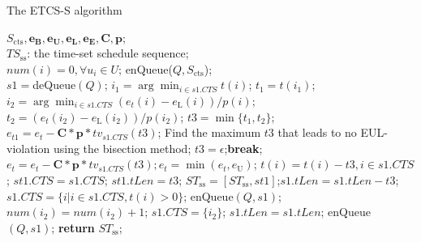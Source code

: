 \documentclass[journal,10pt]{IEEEtran}
\begin{document}
\begin{algorithm}[!htb]
\caption{The ETCS-S algorithm}
\begin{algorithmic}[1]\label{Alg_ETCS_S}
    \REQUIRE $S_\text{cts},\mathbf{e_B}, \mathbf{e_U}, \mathbf{e_L}, \mathbf{e_E}, \mathbf{C}, \mathbf{p}$;\\
    \ENSURE $TS_\text{ss}$: the time-set schedule sequence;\\
    \STATE $num(i)=0, {\forall}u_i{\in}U$; enQueue($Q,S_\text{cts}$); \\
        \STATE $s1{=}$deQueue$(Q)$;
        \STATE $i_1{=}\arg \min_{i{\in}s1.CTS}t(i)$; $t_1{=}t(i_1)$; \label{line_timelen_time}
        \STATE $i_2{=}\arg \min_{i{\in}s1.CTS}(e_t(i){-}e_\text{L}(i))/p(i)$; $t_2{=}(e_t(i_2){-}e_\text{L}(i_2))/p(i_2)$; \label{line_timelen_emin}
            \STATE $t3{=}\min\{t_1,t_2\}$;
            \STATE $e_{t1}{=}e_t{-}\mathbf{C}{*}\mathbf{p}{*}tv_{s1.CTS}(t3)$;
                \STATE Find the maximum $t3$ that leads to no EUL-violation using the bisection method;\label{line_timelen_emax}
                    \STATE $t3{=}\epsilon$;\textbf{break};\label{slicelen2epsilon}
                \ENDIF
            \ENDWHILE
            \STATE $e_{t}{=}e_t{-}\mathbf{C}{*}\mathbf{p}{*}tv_{s1.CTS}(t3); e_{t}{=}\min{(e_{t},e_\text{U})}$;
            \STATE $t(i){=}t(i){-}t3, i{\in}s1.CTS$;
            \STATE $st1.CTS{=}s1.CTS$; $st1.tLen{=}t3$;
            \STATE $ST_\text{ss}{=}[ST_\text{ss},st1]$;$s1.tLen{=}s1.tLen{-}t3$;
            \STATE $s1.CTS{=}\{i|i{\in}s1.CTS, t(i){>}0\}$;
                \STATE enQueue$(Q,s1)$;
            \ENDIF
        \ELSE
            \STATE $num(i_2){=}num(i_2){+}1$;
                \STATE $s1.CTS{=}\{i_2\}$; $s1.tLen{=}s1.tLen$;
                \STATE enQueue$(Q,s1)$;
            \ENDIF
        \ENDIF
     \ENDWHILE
     \STATE \textbf{return} $ST_\text{ss}$;
\end{algorithmic}
\end{algorithm}
\end{document}
